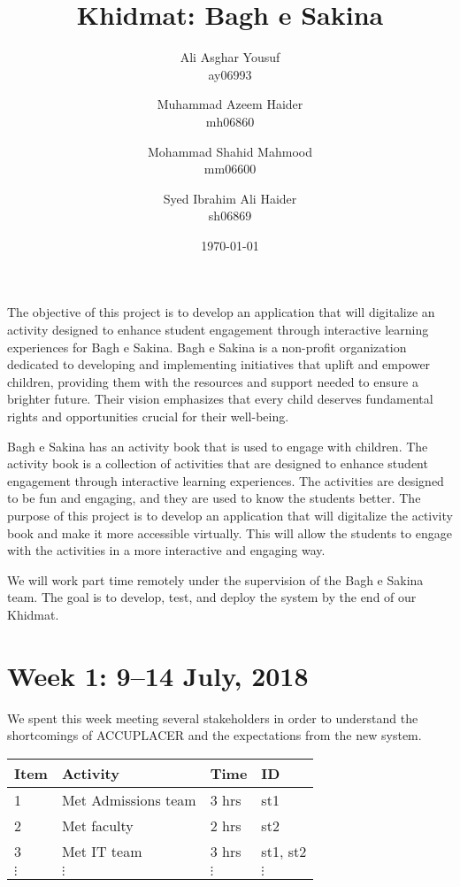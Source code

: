 \documentclass{article}
\title {Khidmat: Bagh e Sakina}
\author{
  Ali Asghar Yousuf\\ ay06993
  \and
  Muhammad Azeem Haider\\ mh06860
  \and
  Mohammad Shahid Mahmood\\ mm06600
  \and
  Syed Ibrahim Ali Haider\\ sh06869
}
\date{\today}
\begin{document}
\maketitle


The objective of this project is to develop an application that will digitalize
an activity designed to enhance student engagement through interactive learning
experiences for Bagh e Sakina.
Bagh e Sakina is a non-profit organization dedicated to developing and
implementing initiatives that uplift and empower children, providing them with
the resources and support needed to ensure a brighter future. Their vision
emphasizes that every child deserves fundamental rights and opportunities
crucial for their well-being.

Bagh e Sakina has an activity book that is used to engage with children. The
activity book is a collection of activities that are designed to enhance
student engagement through interactive learning experiences. The activities are
designed to be fun and engaging, and they are used to know the students better.
The purpose of this project is to develop an application that will digitalize
the activity book and make it more accessible virtually. This will allow the
students to engage with the activities in a more interactive and engaging way.

We will work part time remotely under the supervision of the Bagh e Sakina
team. The goal is to develop, test, and deploy the system by the end of our
Khidmat.

\newpage %
\section*{Week 1: 9--14 July, 2018}

We spent this week meeting several stakeholders in order to understand the
shortcomings of ACCUPLACER and the expectations from the new system.

\begin{tabular}{|l|l|l|l|}
  \hline
  Item     & Activity            & Time     & ID       \\\hline\hline
  1        & Met Admissions team & 3 hrs    & st1      \\\hline
  2        & Met faculty         & 2 hrs    & st2      \\\hline
  3        & Met IT team         & 3 hrs    & st1, st2 \\\hline
  $\vdots$ & $\vdots$            & $\vdots$ & $\vdots$ \\\hline
\end{tabular}
\end{document}
